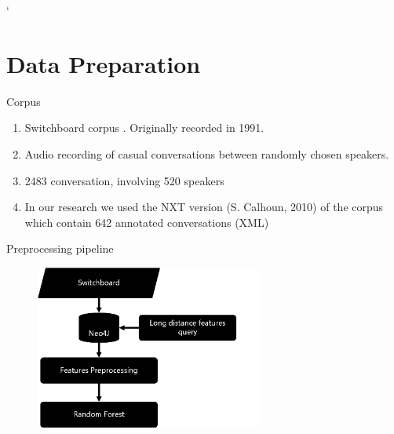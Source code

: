 `%

\section{Data Preparation}
\frame{\sectionpage}


\begin{frame}{Corpus}
    \begin{enumerate}
      \item Switchboard corpus . Originally recorded in 1991. 
      \item Audio recording of casual conversations between randomly chosen speakers.
      \item 2483 conversation, involving 520 speakers
      \item In our research we used the NXT version (S. Calhoun, 2010) of the corpus which contain 642 annotated conversations (XML)
    \end{enumerate}

\end{frame}{}


\begin{frame}{Preprocessing pipeline}
\begin{figure}[ht!]
\centering
\includegraphics[width=20em]{../latex/pipeline.jpg}\vspace{-1em}
\end{figure}
\end{frame}


